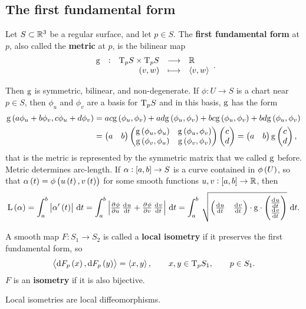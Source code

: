 \pagebreak

\subsection{The first fundamental form}

\begin{definition}
Let $ S \subset \mathbb{R}^3 $ be a regular surface, and let $ p \in S $. The \textbf{first fundamental form} at $ p $, also called the \textbf{metric} at $ p $, is the bilinear map
$$ \function[\g]{\T_p S \times \T_p S}{\RR}{\br{v, w}}{\abr{v, w}}. $$
\end{definition}

Then $ \mathrm{g} $ is symmetric, bilinear, and non-degenerate. If $ \phi : U \to S $ is a chart near $ p \in S $, then $ \phi_u $ and $ \phi_v $ are a basis for $ \mathrm{T}_p S $ and in this basis, $ \mathrm{g} $ has the form
\begin{align*}
\g\br{a\phi_u + b\phi_v, c\phi_u + d\phi_v}
& = ac\g\br{\phi_u, \phi_v} + ad\g\br{\phi_u, \phi_v} + bc\g\br{\phi_u, \phi_v} + bd\g\br{\phi_u, \phi_v} \\
& = \onebytwo{a}{b}\twobytwo{\g\br{\phi_u, \phi_u}}{\g\br{\phi_u, \phi_v}}{\g\br{\phi_v, \phi_u}}{\g\br{\phi_v, \phi_v}}\twobyone{c}{d}
= \onebytwo{a}{b}\g\twobyone{c}{d},
\end{align*}
that is the metric is represented by the symmetric matrix that we called $ \mathrm{g} $ before. Metric determines arc-length. If $ \alpha : \sbr{a, b} \to S $ is a curve contained in $ \phi\br{U} $, so that $ \alpha\br{t} = \phi\br{u\br{t}, v\br{t}} $ for some smooth functions $ u, v : \sbr{a, b} \to \RR $, then
$$ \L\br{\alpha} = \intd{a}{b}{\abs{\alpha'\br{t}}}{t} = \intd{a}{b}{\abs{\tpd{\phi}{u}\tod{u}{t} + \tpd{\phi}{v}\tod{v}{t}}}{t} = \intd{a}{b}{\sqrt{\onebytwo{\tod{u}{t}}{\tod{v}{t}} \cdot \g \cdot \twobyone{\tod{u}{t}}{\tod{v}{t}}}}{t}. $$

\begin{definition}
A smooth map $ F : S_1 \to S_2 $ is called a \textbf{local isometry} if it preserves the first fundamental form, so
$$ \abr{\d F_p\br{x}, \d F_p\br{y}} = \abr{x, y}, \qquad x, y \in \T_p S_1, \qquad p \in S_1. $$
$ F $ is an \textbf{isometry} if it is also bijective.
\end{definition}

\begin{proposition}
Local isometries are local diffeomorphisms.
\end{proposition}


